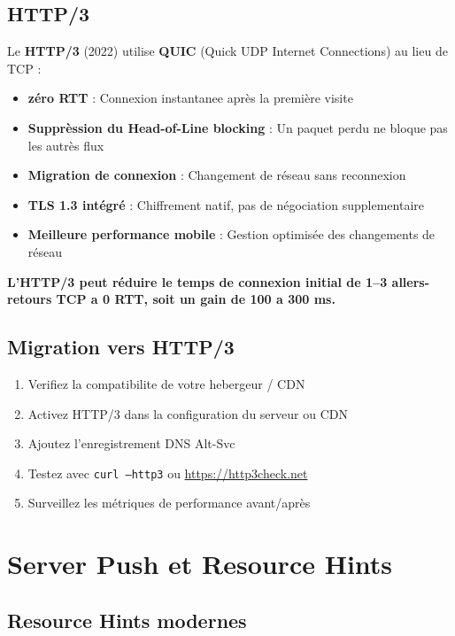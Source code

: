 \documentclass[12pt,a4paper,twoside]{report}
\newcommand{\keyword}[1]{\textbf{\textcolor{googleblue}{#1}}}
\newcommand{\important}[1]{\textbf{\textcolor{googlered}{#1}}}
\begin{document}
\subsection{HTTP/3}

Le \keyword{HTTP/3} (2022) utilise \keyword{QUIC} (Quick UDP Internet Connections) au lieu de TCP :

\begin{itemize}
    \item \textbf{zéro RTT} : Connexion instantanee après la première visite
    \item \textbf{Supprèssion du Head-of-Line blocking} : Un paquet perdu ne bloque pas les autrès flux
    \item \textbf{Migration de connexion} : Changement de réseau sans reconnexion
    \item \textbf{TLS 1.3 intégré} : Chiffrement natif, pas de négociation supplementaire
    \item \textbf{Meilleure performance mobile} : Gestion optimisée des changements de réseau
\end{itemize}

\important{L'HTTP/3 peut réduire le temps de connexion initial de 1--3 allers-retours TCP a 0 RTT, soit un gain de 100 a 300 ms.}

\subsection{Migration vers HTTP/3}

\begin{enumerate}
    \item Verifiez la compatibilite de votre hebergeur / CDN
    \item Activez HTTP/3 dans la configuration du serveur ou CDN
    \item Ajoutez l'enregistrement DNS Alt-Svc
    \item Testez avec \texttt{curl --http3} ou \url{https://http3check.net}
    \item Surveillez les métriques de performance avant/après
\end{enumerate}

\section{Server Push et Resource Hints}

\subsection{Resource Hints modernes}
\end{document}
